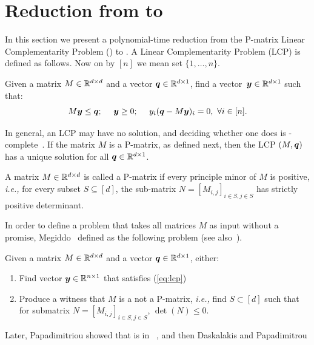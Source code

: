 \chapter{Reduction from \PLCP to \EOPL}
\label{sec:PLCPtoEOPL}

In this section we present a polynomial-time reduction from the P-matrix Linear
Complementarity Problem (\PLCP) to \EOPL.
A Linear Complementarity Problem (LCP) is defined as follows. Now on by $[n]$ we mean set $\{1,\dots,n\}$.

\begin{definition}[LCP]
\label{def:lcp}
Given a matrix $M \in \mathbb{R}^{d \times d}$ and a vector $\mbox{\boldmath $q$}\in \mathbb{R}^{d\times 1}$,
find a vector~{$\mbox{\boldmath $y$}\in \mathbb{R}^{d \times 1}$} such that:
\begin{equation}\label{eq:lcp}
M\mbox{\boldmath $y$}\le \mbox{\boldmath $q$};\ \ \ \ \mbox{\boldmath $y$}\ge 0;\ \ \ \ y_i(\mbox{\boldmath $q$} - M\mbox{\boldmath $y$})_i =0,\ \forall i \in [n].
\end{equation}
\end{definition}
%
In general, an LCP may have no solution, and deciding whether one does is
\NP-complete~\cite{chung1989np}. If the matrix $M$ is a P-matrix, as defined
next, then the LCP $(M,\mbox{\boldmath $q$})$ has a unique solution for all $\mbox{\boldmath $q$}\in \mathbb{R}^{d\times
1}$.
%
\begin{definition}[P-matrix]
\label{def:Pmatrix}
A matrix $M \in \mathbb{R}^{d \times d}$ is called a P-matrix if every principle
minor of $M$ is positive, {\em i.e.,} for every subset $S\subseteq[d]$, the
sub-matrix $N=[M_{i,j}]_{i\in S, j\in S}$ has strictly positive determinant. 
\end{definition}
%
In order to define a problem that takes all matrices $M$ as input without 
a promise, Megiddo~\cite{megiddo1988note} defined \PLCP as the following problem
(see also~\cite{megiddo1991total}).
%
\begin{definition}[\PLCP] \label{def:plcp} Given a matrix $M\in \mathbb{R}^{d\times
d}$ and a vector $\mbox{\boldmath $q$}\in \mathbb{R}^{d\times 1}$, either:
\begin{enumerate}[label=(Q\arabic*)] \item Find vector $\mbox{\boldmath $y$} \in \mathbb{R}^{n
			\times 1}$ that satisfies (\ref{eq:lcp}) \item Produce a witness
that $M$ is a not a P-matrix, {\em i.e.,} find $S\subset [d]$ such that for
submatrix $N=[M_{i,j}]_{i\in S, j\in S}$, $\det(N)\le 0$.  \end{enumerate}
\end{definition}
%
Later, Papadimitriou showed that \PLCP is in
\PPAD~\cite{papadimitriou1994complexity}, and then Daskalakis and Papadimitrou
